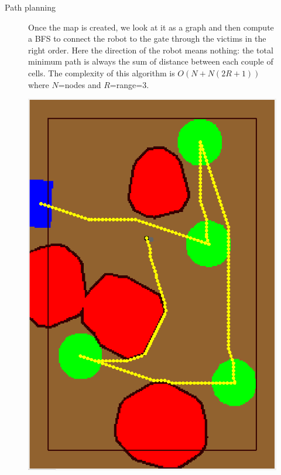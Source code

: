 \begin{frame}[fragile]{Path planning}
\begin{figure}[H]
	\begin{minipage}{0.5\linewidth}
Once the map is created, we look at it as a graph and then compute a BFS to connect the robot to the gate through the victims in the right order.\newline
Here the direction of the robot means nothing: the total minimum path is always the sum of distance between each couple of cells.\newline
The complexity of this algorithm is $O(N+N(2R+1))$ where $N$=nodes and $R$=range=3. 
	\end{minipage}
	\vspace{0.20\linewidth}
	\begin{minipage}{0.40\linewidth}
		\href{https://icosac.github.io/LabRoboticsProject/html/planning_8hh.html}{\includegraphics[scale=0.19]{Immagini/map00}}
	\end{minipage}
\end{figure}
\end{frame}


